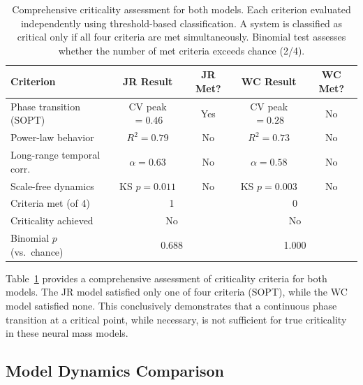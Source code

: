 \documentclass[11pt]{article}
\begin{document}
\begin{table}[H]
\centering
\caption{Comprehensive criticality assessment for both models. Each criterion evaluated independently using threshold-based classification. A system is classified as critical only if all four criteria are met simultaneously. Binomial test assesses whether the number of met criteria exceeds chance (2/4).}
\label{tab:criticality_summary}
\begin{tabular}{lcccc}
\toprule
Criterion & JR Result & JR Met? & WC Result & WC Met? \\
\midrule
Phase transition (SOPT) & CV peak $= 0.46$ & Yes & CV peak $= 0.28$ & No \\
Power-law behavior & $R^2 = 0.79$ & No & $R^2 = 0.73$ & No \\
Long-range temporal corr. & $\alpha = 0.63$ & No & $\alpha = 0.58$ & No \\
Scale-free dynamics & KS $p = 0.011$ & No & KS $p = 0.003$ & No \\
\midrule
Criteria met (of 4) & \multicolumn{2}{c}{1} & \multicolumn{2}{c}{0} \\
Criticality achieved & \multicolumn{2}{c}{No} & \multicolumn{2}{c}{No} \\
Binomial $p$ (vs.\ chance) & \multicolumn{2}{c}{0.688} & \multicolumn{2}{c}{1.000} \\
\bottomrule
\end{tabular}
\end{table}

Table~\ref{tab:criticality_summary} provides a comprehensive assessment of criticality criteria for both models. The JR model satisfied only one of four criteria (SOPT), while the WC model satisfied none. This conclusively demonstrates that a continuous phase transition at a critical point, while necessary, is not sufficient for true criticality in these neural mass models.

\subsection{Model Dynamics Comparison}
\end{document}
